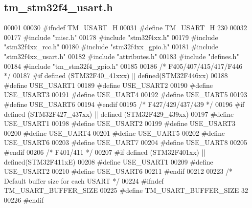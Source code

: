\hypertarget{tm__stm32f4__usart_8h_source}{}\subsection{tm\+\_\+stm32f4\+\_\+usart.\+h}

\begin{DoxyCode}
00001 
00030 \textcolor{preprocessor}{#ifndef TM\_USART\_H}
00031 \textcolor{preprocessor}{#define TM\_USART\_H 230}
00032 
00177 \textcolor{preprocessor}{#include "misc.h"}
00178 \textcolor{preprocessor}{#include "stm32f4xx.h"}
00179 \textcolor{preprocessor}{#include "stm32f4xx\_rcc.h"}
00180 \textcolor{preprocessor}{#include "stm32f4xx\_gpio.h"}
00181 \textcolor{preprocessor}{#include "stm32f4xx\_usart.h"}
00182 \textcolor{preprocessor}{#include "attributes.h"}
00183 \textcolor{preprocessor}{#include "defines.h"}
00184 \textcolor{preprocessor}{#include "tm\_stm32f4\_gpio.h"}
00185 
00186 \textcolor{comment}{/* F405/407/415/417/F446 */}
00187 \textcolor{preprocessor}{#if defined (STM32F40\_41xxx) || defined(STM32F446xx)}
00188 \textcolor{preprocessor}{#define USE\_USART1}
00189 \textcolor{preprocessor}{#define USE\_USART2}
00190 \textcolor{preprocessor}{#define USE\_USART3}
00191 \textcolor{preprocessor}{#define USE\_UART4}
00192 \textcolor{preprocessor}{#define USE\_UART5}
00193 \textcolor{preprocessor}{#define USE\_USART6}
00194 \textcolor{preprocessor}{#endif}
00195 \textcolor{comment}{/* F427/429/437/439 */}
00196 \textcolor{preprocessor}{#if defined (STM32F427\_437xx) || defined (STM32F429\_439xx)}
00197 \textcolor{preprocessor}{#define USE\_USART1}
00198 \textcolor{preprocessor}{#define USE\_USART2}
00199 \textcolor{preprocessor}{#define USE\_USART3}
00200 \textcolor{preprocessor}{#define USE\_UART4}
00201 \textcolor{preprocessor}{#define USE\_UART5}
00202 \textcolor{preprocessor}{#define USE\_USART6}
00203 \textcolor{preprocessor}{#define USE\_UART7}
00204 \textcolor{preprocessor}{#define USE\_UART8}
00205 \textcolor{preprocessor}{#endif}
00206 \textcolor{comment}{/* F401/411 */}
00207 \textcolor{preprocessor}{#if defined (STM32F401xx) || defined(STM32F411xE)}
00208 \textcolor{preprocessor}{#define USE\_USART1}
00209 \textcolor{preprocessor}{#define USE\_USART2}
00210 \textcolor{preprocessor}{#define USE\_USART6}
00211 \textcolor{preprocessor}{#endif}
00212 
00223 \textcolor{comment}{/* Default buffer size for each USART */}
00224 \textcolor{preprocessor}{#ifndef TM\_USART\_BUFFER\_SIZE}
00225 \textcolor{preprocessor}{#define TM\_USART\_BUFFER\_SIZE                32}
00226 \textcolor{preprocessor}{#endif}

\end{DoxyCode}
